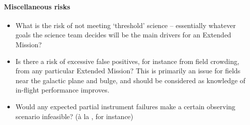 \paragraph{Miscellaneous risks}
\begin{itemize}
	\item What is the risk of not meeting `threshold' science -- essentially 
	whatever goals the \tess science team decides will be the main drivers for 
	an Extended Mission?
	\item Is there a risk of excessive false positives, for instance from field 
	crowding, from any particular Extended Mission? This is primarily an issue 
	for fields near the galactic plane and bulge, and should be considered as 
	knowledge of \tesss in-flight performance improves.
	\item Would any expected partial instrument failures make a certain observing scenario infeasible? (\`a la \ktwo\!, for instance)
\end{itemize}

